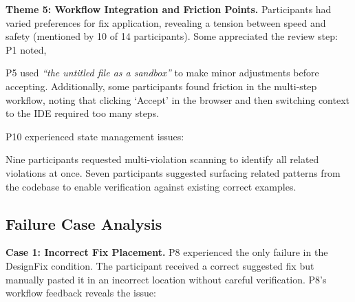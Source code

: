\textbf{Theme 5: Workflow Integration and Friction Points.} Participants had varied preferences for fix application, revealing a tension between speed and safety (mentioned by 10 of 14 participants). Some appreciated the review step: P1 noted, 


P5 used \textit{``the untitled file as a sandbox''} to make minor adjustments before accepting. Additionally, some participants found friction in the multi-step workflow, noting that clicking `Accept' in the browser and then switching context to the IDE required too many steps.

P10 experienced state management issues: 


Nine participants requested multi-violation scanning to identify all related violations at once. Seven participants suggested surfacing related patterns from the codebase to enable verification against existing correct examples.


\subsection{Failure Case Analysis}
\label{sec:failure-analysis}

\textbf{Case 1: Incorrect Fix Placement.} P8 experienced the only failure in the DesignFix condition. The participant received a correct suggested fix 
but manually pasted it in an incorrect location without careful verification. 
P8's workflow feedback reveals the issue: 


